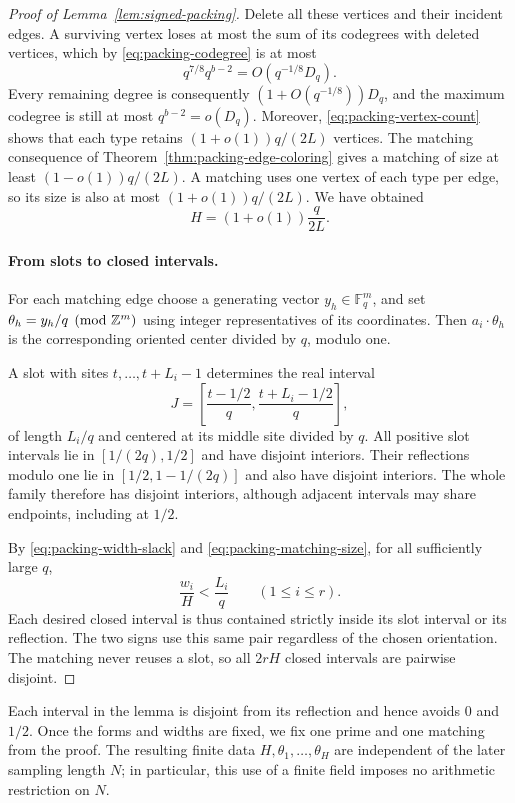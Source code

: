 \begin{proof}[Proof of Lemma~\ref{lem:signed-packing}]
Delete all these vertices and their incident edges.  A surviving vertex
loses at most the sum of its codegrees with deleted vertices, which by
\eqref{eq:packing-codegree} is at most
\[
 q^{7/8}q^{b-2}=O(q^{-1/8}D_q).
\]
Every remaining degree is consequently $(1+O(q^{-1/8}))D_q$, and the
maximum codegree is still at most $q^{b-2}=o(D_q)$.  Moreover,
\eqref{eq:packing-vertex-count} shows that each type retains
$(1+o(1))q/(2L)$ vertices.  The matching consequence of
Theorem~\ref{thm:packing-edge-coloring} gives a matching of size at least
$(1-o(1))q/(2L)$.  A matching uses one vertex of each type per edge,
so its size is also at most $(1+o(1))q/(2L)$.  We have obtained
\begin{equation}
 H=(1+o(1))\frac q{2L}.
 \label{eq:packing-matching-size}
\end{equation}

\paragraph{From slots to closed intervals.}
For each matching edge choose a generating vector
$y_h\in\mathbb F_q^m$, and set $\theta_h=y_h/q\pmod{\mathbb Z^m}$ using
integer representatives of its coordinates.  Then
$a_i\cdot\theta_h$ is the corresponding oriented center divided by
$q$, modulo one.

A slot with sites $t,\ldots,t+L_i-1$ determines the real interval
\[
 J=\left[\frac{t-1/2}{q},\frac{t+L_i-1/2}{q}\right],
\]
of length $L_i/q$ and centered at its middle site divided by $q$.
All positive slot intervals lie in $[1/(2q),1/2]$ and have disjoint
interiors.  Their reflections modulo one lie in
$[1/2,1-1/(2q)]$ and also have disjoint interiors.  The whole family
therefore has disjoint interiors, although adjacent intervals may
share endpoints, including at $1/2$.

By \eqref{eq:packing-width-slack} and
\eqref{eq:packing-matching-size}, for all sufficiently large $q$,
\[
 \frac{w_i}{H}<\frac{L_i}{q}\qquad(1\le i\le r).
\]
Each desired closed interval is thus contained strictly inside its
slot interval or its reflection.  The two signs use this same pair
regardless of the chosen orientation.  The matching never reuses a
slot, so all $2rH$ closed intervals are pairwise disjoint.
\end{proof}

Each interval in the lemma is disjoint from its reflection and hence
avoids $0$ and $1/2$.  Once the forms and widths are fixed, we fix one
prime and one matching from the proof.  The resulting finite data
$H,\theta_1,\ldots,\theta_H$ are independent of the later sampling
length $N$; in particular, this use of a finite field imposes no
arithmetic restriction on $N$.
